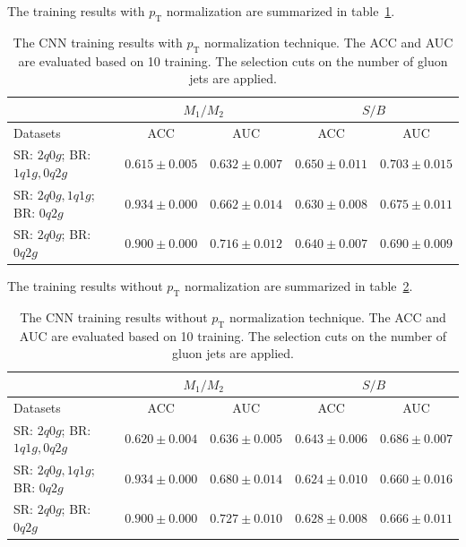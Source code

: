 \documentclass[12pt]{article}
\begin{document}
        The training results with $p_{\text{T}}$ normalization are summarized in table~\ref{tab:CWoLa_CNN_training_results_3000_jet_tagging_w_pT_norm}. 
        \begin{table}[htpb]
            \centering
            \caption{The CNN training results with $p_{\text{T}}$ normalization technique. The ACC and AUC are evaluated based on 10 training. The selection cuts on the number of gluon jets are applied.}
            \label{tab:CWoLa_CNN_training_results_3000_jet_tagging_w_pT_norm}
            \begin{tabular}{l|cc|cc}
                                             & \multicolumn{2}{c|}{$M_1 / M_2$}      & \multicolumn{2}{c}{$S / B$}           \\ \hline
                Datasets                     & ACC               & AUC               & ACC               & AUC               \\ \hline
                SR: $2q0g$; BR: $1q1g, 0q2g$ & $0.615 \pm 0.005$ & $0.632 \pm 0.007$ & $0.650 \pm 0.011$ & $0.703 \pm 0.015$ \\
                SR: $2q0g, 1q1g$; BR: $0q2g$ & $0.934 \pm 0.000$ & $0.662 \pm 0.014$ & $0.630 \pm 0.008$ & $0.675 \pm 0.011$ \\
                SR: $2q0g$; BR: $0q2g$       & $0.900 \pm 0.000$ & $0.716 \pm 0.012$ & $0.640 \pm 0.007$ & $0.690 \pm 0.009$
            \end{tabular}
        \end{table}

        The training results without $p_{\text{T}}$ normalization are summarized in table~\ref{tab:CWoLa_CNN_training_results_3000_jet_tagging_wo_pT_norm}. 
        \begin{table}[htpb]
            \centering
            \caption{The CNN training results without $p_{\text{T}}$ normalization technique. The ACC and AUC are evaluated based on 10 training. The selection cuts on the number of gluon jets are applied.}
            \label{tab:CWoLa_CNN_training_results_3000_jet_tagging_wo_pT_norm}
            \begin{tabular}{l|cc|cc}
                                             & \multicolumn{2}{c|}{$M_1 / M_2$}      & \multicolumn{2}{c}{$S / B$}           \\ \hline
                Datasets                     & ACC               & AUC               & ACC               & AUC               \\ \hline
                SR: $2q0g$; BR: $1q1g, 0q2g$ & $0.620 \pm 0.004$ & $0.636 \pm 0.005$ & $0.643 \pm 0.006$ & $0.686 \pm 0.007$ \\
                SR: $2q0g, 1q1g$; BR: $0q2g$ & $0.934 \pm 0.000$ & $0.680 \pm 0.014$ & $0.624 \pm 0.010$ & $0.660 \pm 0.016$ \\
                SR: $2q0g$; BR: $0q2g$       & $0.900 \pm 0.000$ & $0.727 \pm 0.010$ & $0.628 \pm 0.008$ & $0.666 \pm 0.011$
            \end{tabular}
        \end{table}
\end{document}
